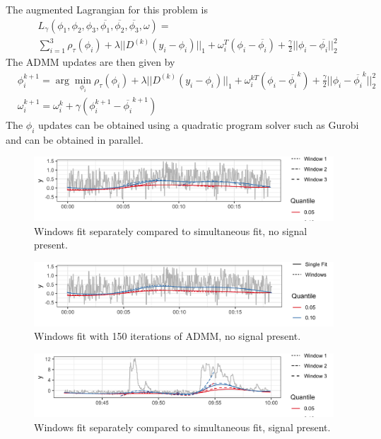 \documentclass[12pt]{article}
\begin{document}
	The augmented Lagrangian for this problem is 
	\begin{align}
	&L_\gamma(\phi_1,\phi_2, \phi_3, \overline{\phi_1}, \overline{\phi_2}, \overline{\phi_3}, \omega) = \\
	&\sum_{i=1}^3 \rho_\tau(\phi_i) + \lambda||D^{(k)}(y_i-\phi_i)||_1 + \omega_i^T(\phi_i - \overline{\phi_i}) + \frac{\gamma}{2}||\phi_i - \overline{\phi_i}||_2^2
	\end{align}
	The ADMM updates are then given by
	\begin{align}
	&\phi_i^{k+1} = \arg\min_{\phi_i}\rho_\tau(\phi_i) + \lambda||D^{(k)}(y_i-\phi_i)||_1 + \omega_i^{kT}(\phi_i - \overline{\phi_i}^k) + \frac{\gamma}{2}||\phi_i - \overline{\phi_i}^k||_2^2\\
	&\omega_i^{k+1} = \omega_i^{k} + \gamma(\phi_i^{k+1} - \overline{\phi_i}^{k+1})
	\end{align}
	The $\phi_i$ updates can be obtained using a quadratic program solver such as Gurobi and can be obtained in parallel. 
	
	\pagebreak 
	
	\begin{figure}[!h] 
		\caption{Windows fit separately compared to simultaneous fit, no signal present.}
		\includegraphics[width = \linewidth]{Figures/overlapping_windows.png}
	\end{figure}
	
	\begin{figure}[!h] 
		\caption{Windows fit with 150 iterations of ADMM, no signal present.}
		\includegraphics[width = \linewidth]{Figures/admm_windows.png}
	\end{figure}
	
	\begin{figure}[!h] 
		\caption{Windows fit separately compared to simultaneous fit, signal present.}
		\includegraphics[width = \linewidth]{Figures/overlapping_windows2.png}
	\end{figure}
	
\end{document}

